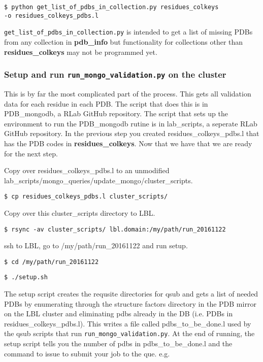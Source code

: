 \documentclass[12pt]{article}
\newcommand{\mdbdb}[1]{{\color{BlueViolet}\textbf{#1}}}
\newcommand{\mdbcol}[1]{{\color{Bittersweet}\textbf{#1}}}
\begin{document}
\vspace{5mm}
\noindent
\texttt{\$ python get\_list\_of\_pdbs\_in\_collection.py residues\_colkeys\\-o residues\_colkeys\_pdbs.l}

\vspace{5mm}
\noindent
\texttt{get\_list\_of\_pdbs\_in\_collection.py} is intended to get a list of missing PDBs from any collection in \mdbdb{pdb\_info} but functionality for collections other than \mdbcol{residues\_colkeys} may not be programmed yet.

\subsubsection*{Setup and run \texttt{run\_mongo\_validation.py} on the cluster}
This is by far the most complicated part of the process. This gets all validation data for each residue in each PDB. The script that does this is in PDB\_mongodb, a RLab GitHub repository. The script that sets up the environment to run the PDB\_mongodb rutine is in lab\_scripts, a seperate RLab GitHub repository. In the previous step you created residues\_colkeys\_pdbs.l that has the PDB codes in \mdbcol{residues\_colkeys}. Now that we have that we are ready for the next step.

\vspace{5mm}
\noindent
Copy over residues\_colkeys\_pdbs.l to an unmodified\\lab\_scripts/mongo\_queries/update\_mongo/cluster\_scripts.  

\vspace{2mm}
\noindent
\texttt{\$ cp residues\_colkeys\_pdbs.l cluster\_scripts/}

\vspace{5mm}
\noindent
Copy over this cluster\_scripts directory to LBL.  

\vspace{2mm}
\noindent
\texttt{\$ rsync -av cluster\_scripts/ lbl.domain:/my/path/run\_20161122}

\vspace{5mm}
\noindent
ssh to LBL, go to /my/path/run\_20161122 and run setup.

\vspace{2mm}
\noindent
\texttt{\$ cd /my/path/run\_20161122}

\noindent
\texttt{\$ ./setup.sh}

\vspace{5mm}
\noindent
The setup script creates the requsite directories for qsub and gets a list of needed PDBs by enumerating through the structure factors directory in the PDB mirror on the LBL cluster and eliminating pdbs already in the DB (i.e. PDBs in residues\_colkeys\_pdbs.l). This writes a file called pdbs\_to\_be\_done.l used by the qsub scripts that run \texttt{run\_mongo\_validation.py}. At the end of running, the setup script tells you the number of pdbs in pdbs\_to\_be\_done.l and the command to issue to submit your job to the que. e.g.
\end{document}
